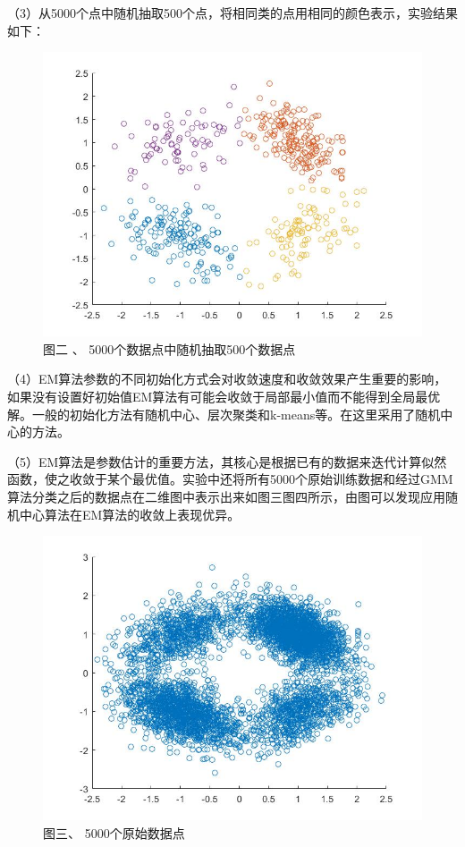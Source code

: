 \documentclass[bachelor]{ctexart}
\begin{document}
（3）从5000个点中随机抽取500个点，将相同类的点用相同的颜色表示，实验结果如下：
\begin{figure}[!htb]
  \centering
  \includegraphics[scale=0.45]{figure2.jpg}\\
  {\footnotesize 图二 、   5000个数据点中随机抽取500个数据点}\\
\end{figure}

（4）EM算法参数的不同初始化方式会对收敛速度和收敛效果产生重要的影响，如果没有设置好初始值EM算法有可能会收敛于局部最小值而不能得到全局最优解。一般的初始化方法有随机中心、层次聚类和k-means等。在这里采用了随机中心的方法。

（5）EM算法是参数估计的重要方法，其核心是根据已有的数据来迭代计算似然函数，使之收敛于某个最优值。实验中还将所有5000个原始训练数据和经过GMM算法分类之后的数据点在二维图中表示出来如图三图四所示，由图可以发现应用随机中心算法在EM算法的收敛上表现优异。
\begin{figure}[!htb]
  \centering
  \includegraphics[scale=0.45]{3.jpg}\\
  {\footnotesize 图三、   5000个原始数据点}\\
\end{figure}
\end{document}
